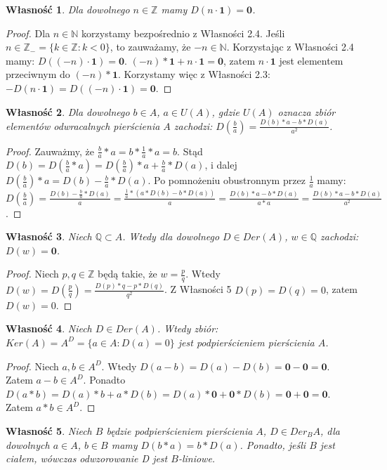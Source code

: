 \documentclass[12pt,a4paper]{article}
\newtheorem{wl}{Własność}[section]
\numberwithin{equation}{section}
\begin{document}
\begin{wl}
Dla dowolnego $n \in \mathbb{Z}$ mamy $D(n \cdot \textbf{1})=\textbf{0}$.
\end{wl}
\begin{proof}
Dla  $n \in \mathbb{N}$ korzystamy bezpośrednio z Własności 2.4. Jeśli \\$n \in \mathbb{Z_{-}}= \{ k \in \mathbb{Z}: k<0 \}$, to zauważamy, że $-n \in \mathbb{N}$.
Korzystając z Własności 2.4 mamy:  $D((-n) \cdot \textbf{1})=\textbf{0}$. $(-n)*\textbf{1}+n \cdot \textbf{1}=\textbf{0}$, zatem 
$n \cdot \textbf{1}$ jest elementem przeciwnym do $(-n)*\textbf{1}$. Korzystamy więc z Własności 2.3: $-D(n \cdot\textbf{1})=D((-n) \cdot \textbf{1})=\textbf{0}$.
\end{proof}
\begin{wl}
Dla dowolnego $b \in A$, $a \in U(A)$, gdzie $U(A)$ oznacza zbiór elementów odwracalnych pierścienia $A$ zachodzi: $D(\frac{b}{a})=\frac{D(b)*a-b*D(a)}{a^{2}}$.
\end{wl}
\begin{proof}
Zauważmy, że $\frac{b}{a}*a=b* \frac{1}{a}*a=b$. Stąd $D(b)=D(\frac{b}{a}*a)=D(\frac{b}{a})*a+\frac{b}{a}*D(a)$, i dalej $D(\frac{b}{a})*a=D(b)-\frac{b}{a}*D(a)$. Po pomnożeniu obustronnym przez $\frac{1}{a}$ mamy:
 $D(\frac{b}{a})=\frac{D(b)-\frac{b}{a}*D(a)}{a}=\frac{\frac{1}{a}*(a*D(b)-b*D(a))}{a}=\frac{D(b)*a-b*D(a)}{a*a}=\frac{D(b)*a-b*D(a)}{a^{2}}$.
\end{proof}
\begin{wl}
Niech $\mathbb{Q} \subset{A}$. Wtedy dla dowolnego $D \in Der(A)$, $w \in \mathbb{Q}$ zachodzi: $D(w)=\textbf{0}$.
\end{wl}
\begin{proof}
Niech $p,q \in \mathbb{Z}$ będą takie, że $w=\frac{p}{q}$. Wtedy $D(w)=D(\frac{p}{q})=\frac{D(p)*q-p*D(q)}{q^{2}}$. Z Własności 5 $D(p)=D(q)=0$, zatem $D(w)=0$.
\end{proof}
\begin{wl}
Niech $D \in Der(A)$. Wtedy zbiór: \\$Ker(A)=A^{D}= \{ a \in A: D(a)=0 \}$ jest podpierścieniem pierścienia $A$.
\end{wl}
\begin{proof}
Niech $a,b \in A^{D}$. Wtedy 
$D(a-b)=D(a)-D(b)=\textbf{0}-\textbf{0}=\textbf{0}$. Zatem $a-b \in A^{D}$. Ponadto 
$D(a*b)=D(a)*b+a*D(b)=D(a)*\textbf{0}+\textbf{0}*D(b)=\textbf{0}+\textbf{0}=\textbf{0}$. Zatem $a*b \in A^{D}$.
\end{proof}
\begin{wl}
Niech $B$ będzie podpierścieniem pierścienia $A$, $D \in Der_{B}A$, dla dowolnych $a \in A$, $b \in B$ mamy $D(b*a)=b*D(a)$. Ponadto, jeśli $B$ jest ciałem, wówczas odwzorowanie D jest $B$-liniowe.
\end{wl}
\end{document}
